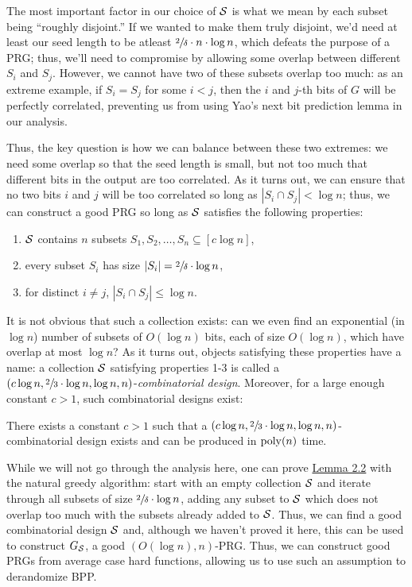 \documentclass[11pt]{article}
\begin{document}
\noindent
The most important factor in our choice of $\mathcal{S}$ is what we mean by each subset being ``roughly disjoint.'' If we wanted to make them truly disjoint, we'd need at least our seed length to be atleast $\sfrac{2}{\delta} \cdot n \cdot \log n$, which defeats the purpose of a PRG; thus, we'll need to compromise by allowing some overlap between different $S_i$ and $S_j$. However, we cannot have two of these subsets overlap too much: as an extreme example, if $S_i = S_j$ for some $i < j$, then the $i$ and $j$-th bits of $G$ will be perfectly correlated, preventing us from using Yao's next bit prediction lemma in our analysis.

Thus, the key question is how we can balance between these two extremes: we need some overlap so that the seed length is small, but not too much that different bits in the output are too correlated. As it turns out, we can ensure that no two bits $i$ and $j$ will be too correlated so long as $|S_i \cap S_j| < \log n$; thus, we can construct a good PRG so long as $\mathcal{S}$ satisfies the following properties:
\begin{enumerate}
    \item $\mathcal{S}$ contains $n$ subsets $S_1, S_2, \ldots, S_n \subseteq [c \log n]$,
    \item every subset $S_i$ has size $|S_i| = \sfrac{2}{\delta} \cdot \log n$,
    \item for distinct $i \neq j$, $|S_i \cap S_j| \leq \log n$.
\end{enumerate}
It is not obvious that such a collection exists:  can we even find an exponential (in $\log n$) number of subsets of $O(\log n)$ bits, each of size $O(\log n)$, which have overlap at most $\log n$? As it turns out, objects satisfying these properties have a name: a collection $\mathcal{S}$ satisfying properties 1-3 is called a $(c \log n, \sfrac{2}{3} \cdot \log n, \log n, n)$-\emph{combinatorial design}. Moreover, for a large enough constant $c > 1$, such combinatorial designs exist:

\begin{lemma}{2.2}[\cite{NW94}]\label{l-2-2}
    There exists a constant $c > 1$ such that a $(c \log n, \sfrac{2}{3} \cdot \log n, \log n, n)$-combinatorial design exists and can be produced in $\mathrm{poly}(n)$ time.
\end{lemma}

While we will not go through the analysis here, one can prove \hyperref[l-2-2]{Lemma 2.2} with the natural greedy algorithm: start with an empty collection $\mathcal{S}$ and iterate through all subsets of size $\sfrac{2}{\delta} \cdot \log n$, adding any subset to $\mathcal{S}$ which does not overlap too much with the subsets already added to $\mathcal{S}$. Thus, we can find a good combinatorial design $\mathcal{S}$ and, although we haven't proved it here, this can be used to construct $G_{\mathcal{S}}$, a good $(O(\log n), n)$-PRG. Thus, we can construct good PRGs from average case hard functions, allowing us to use such an assumption to derandomize BPP.
\end{document}
